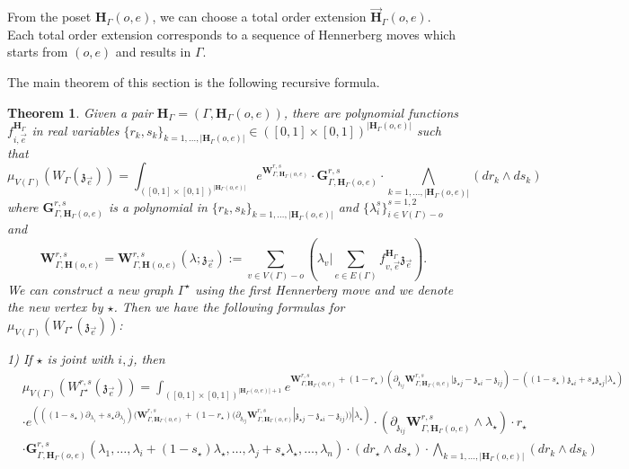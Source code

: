 \documentclass[11pt]{amsart}
\newtheorem{thm}{Theorem}[section]
\theoremstyle{definition}
\theoremstyle{remark}
\numberwithin{equation}{section}
\begin{document}
From the poset $\mathbf{H}_{\Gamma}(o,e)$, we can choose a total order extension $\vec{\mathbf{H}}_{\Gamma}(o,e)$. Each total order extension corresponds to a sequence of Hennerberg moves which starts from $(o,e)$ and results in $\Gamma$.

The main theorem of this section is the following recursive formula.

\begin{thm}\label{MainTheoremRecursiveRS}
Given a pair $\mathbf{H}_{\Gamma}=(\Gamma,\mathbf{H}_{\Gamma}(o,e))$, there are polynomial functions $f^{\mathbf{H}_{\Gamma}}_{i,\vec{e}}$ in real variables $\{r_k,s_k\}_{k=1,\dots,|\mathbf{H}_{\Gamma}(o,e)|}\in ([0,1]\times[0,1])^{|\mathbf{H}_{\Gamma}(o,e)|}$ such that
$$
\mu_{V(\Gamma)}\left(W_{\Gamma}(\mathfrak{z}_{\vec{e}})\right)=\int_{([0,1]\times[0,1])^{|\mathbf{H}_{\Gamma}(o,e)|}}e^{\mathbf{W}^{r,s}_{\Gamma,\mathbf{H}_{\Gamma}(o,e)}}\cdot \mathbf{G}^{r,s}_{\Gamma,\mathbf{H}_{\Gamma}(o,e)}\cdot \bigwedge_{k=1,\dots,|\mathbf{H}_{\Gamma}(o,e)|} (dr_k\wedge ds_k)
$$
where $\mathbf{G}^{r,s}_{\Gamma,\mathbf{H}_{\Gamma}(o,e)}$ is a polynomial in $\{r_k,s_k\}_{k=1,\dots,|\mathbf{H}_{\Gamma}(o,e)|}$ and $\{\lambda^s_i\}^{s=1,2}_{i\in V(\Gamma)-o}$ and
$$
    \mathbf{W}^{r,s}_{\Gamma,\mathbf{H}(o,e)}=\mathbf{W}^{r,s}_{\Gamma,\mathbf{H}(o,e)}(\lambda;\mathfrak{z}_{\vec{e}}):=\sum_{v\in V(\Gamma)-o}(\lambda_v|\sum_{e\in E(\Gamma)}f^{\mathbf{H}_{\Gamma}}_{v,\vec{e}}\mathfrak{z}_{\vec{e}}).
$$
We can construct a new graph $\Gamma^{\star}$ using the first Hennerberg move and we denote the new vertex by $\star$. Then we have the following formulas for $\mu_{V(\Gamma)}\left(W_{\Gamma^{\star}}(\mathfrak{z}_{\vec{e}})\right)$:

  1) If $\star$ is joint with $i,j$, then
\begin{align*}
& \mu_{V(\Gamma)}\left(W^{r,s}_{\Gamma^{\star}}(\mathfrak{z}_{\vec{e}})\right)  = \int_{([0,1]\times[0,1])^{|\mathbf{H}_{\Gamma}(o,e)|+1}} e^{\mathbf{W}^{r,s}_{\Gamma,\mathbf{H}_{\Gamma}(o,e)}+(1-r_{\star})\left(\partial_{\mathfrak{z}_{ij}}\mathbf{W}^{r,s}_{\Gamma,\mathbf{H}_{\Gamma}(o,e)}|\mathfrak{z}_{\star j}-\mathfrak{z}_{\star i}-\mathfrak{z}_{ij}\right)-\left((1-s_{\star})\mathfrak{z}_{\star i}+s_{\star}\mathfrak{z}_{\star j}|\lambda_{\star}\right)} \\
   & \cdot e^{\left(((1-s_{\star})\partial_{\lambda_i}+s_{\star}\partial_{\lambda_j})(\mathbf{W}^{r,s}_{\Gamma,\mathbf{H}_{\Gamma}(o,e)}+(1-r_{\star})(\partial_{\mathfrak{z}_{ij}}\mathbf{W}^{r,s}_{\Gamma,\mathbf{H}_{\Gamma}(o,e)}|\mathfrak{z}_{\star j}-\mathfrak{z}_{\star i}-\mathfrak{z}_{ij}))|\lambda_{\star}\right)}\cdot \left(\partial_{\mathfrak{z}_{ij}}\mathbf{W}^{r,s}_{\Gamma,\mathbf{H}_{\Gamma}(o,e)}\wedge\lambda_{\star}\right)\cdot r_{\star}\\
   &\cdot  \mathbf{G}^{r,s}_{\Gamma,\mathbf{H}_{\Gamma}(o,e)}(\lambda_1,\dots,\lambda_i+(1-s_{\star})\lambda_{\star},\dots,\lambda_j+s_{\star}\lambda_{\star},\dots,\lambda_{n})\cdot (dr_{\star}\wedge ds_{\star})\cdot \bigwedge_{k=1,\dots,|\mathbf{H}_{\Gamma}(o,e)|} (dr_k\wedge ds_k)
\end{align*}


\end{thm}
\end{document}
